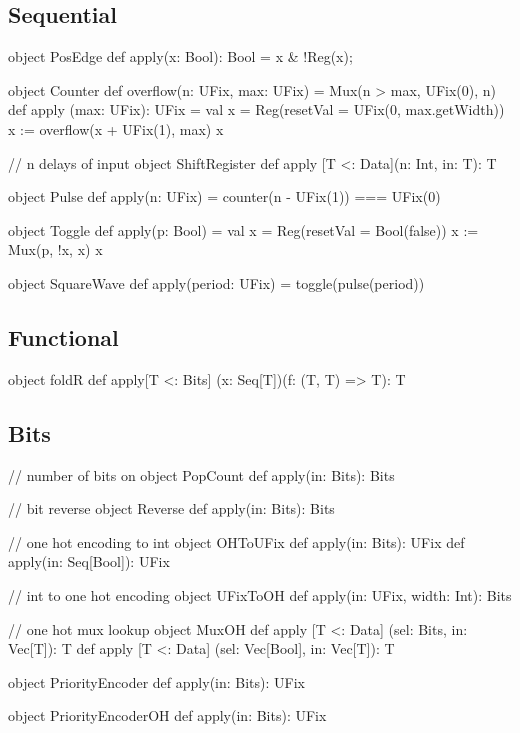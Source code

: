 \documentclass[10pt,twocolumn]{article}
\begin{document}
\subsection{Sequential}

\begin{scala}
object PosEdge {
  def apply(x: Bool): Bool = 
    x & !Reg(x);
}

object Counter {
  def overflow(n: UFix, max: UFix) =
    Mux(n > max, UFix(0), n)
  def apply (max: UFix): UFix = {
    val x = Reg(resetVal = UFix(0, max.getWidth))
    x := overflow(x + UFix(1), max)
    x
  }
}

// n delays of input
object ShiftRegister {
  def apply [T <: Data](n: Int, in: T): T
}

object Pulse {
  def apply(n: UFix) = 
    counter(n - UFix(1)) === UFix(0)
}

object Toggle {
  def apply(p: Bool) = {
    val x = Reg(resetVal = Bool(false))
    x := Mux(p, !x, x)
    x
  }
}

object SquareWave {
  def apply(period: UFix) =
    toggle(pulse(period))
}
\end{scala}

\subsection{Functional}


\begin{scala}
object foldR {
  def apply[T <: Bits]
    (x: Seq[T])(f: (T, T) => T): T
}
\end{scala}

\subsection{Bits}

\begin{scala}
// number of bits on
object PopCount {
  def apply(in: Bits): Bits
}

// bit reverse
object Reverse {
  def apply(in: Bits): Bits
}

// one hot encoding to int
object OHToUFix {
  def apply(in: Bits): UFix
  def apply(in: Seq[Bool]): UFix
}

// int to one hot encoding
object UFixToOH {
  def apply(in: UFix, width: Int): Bits
}

// one hot mux lookup
object MuxOH {
  def apply [T <: Data]
    (sel: Bits, in: Vec[T]): T
  def apply [T <: Data]
    (sel: Vec[Bool], in: Vec[T]): T
}

object PriorityEncoder {
  def apply(in: Bits): UFix
}

object PriorityEncoderOH {
  def apply(in: Bits): UFix
}
\end{scala}
\end{document}

